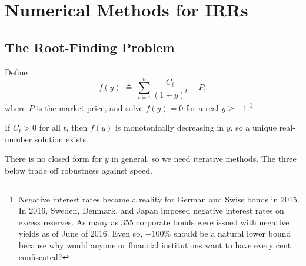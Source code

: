 \section{Numerical Methods for IRRs}
\label{sec:numerical-irr}


\subsection{The Root-Finding Problem}

Define
\[
	f(y) \;\triangleq\; \sum_{t=1}^{n} \frac{C_{t}}{(1+y)^{t}} - P ,
\]
where $P$ is the market price, and solve $f(y) = 0$ for a real $y \ge -1$.\footnote{Negative interest rates became a reality for German and Swiss bonds in 2015.
In 2016, Sweden, Denmark, and Japan imposed negative interest rates on excess reserves.
As many as 355 corporate bonds were issued with negative yields as of June of 2016.
Even so, $-100\%$ should be a natural lower bound because why would anyone or financial institutions want to have every cent confiscated?}

\begin{proposition}
	If $C_{t} > 0$ for all $t$, then $f(y)$ is monotonically decreasing in $y$, so a unique real-number solution exists.
	\label{prop:irr-unique}
\end{proposition}

\suppstart
There is no closed form for $y$ in general, so we need iterative methods.
The three below trade off robustness against speed.

